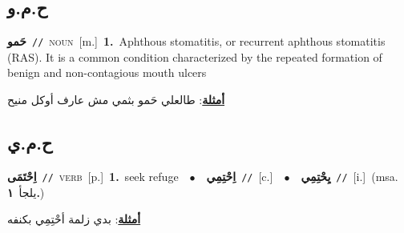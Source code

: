 \documentclass[10pt,a4paper,twoside]{article} %
\begin{document}
\begin{multicols}{2}
\vspace{-3mm}
\subsection*{\color{blue}\foreignlanguage{arabic}{ح.م.و}\color{blue}{}} 

{\setlength\topsep{0pt}\textbf{\foreignlanguage{arabic}{حَمو}}\ {\color{gray}\texttt{//}\color{black}}\ \textsc{noun}\ [m.]\ \textbf{1.}~Aphthous stomatitis, or recurrent aphthous stomatitis (RAS). It is a common condition characterized by the repeated formation of benign and non-contagious mouth ulcers\  \begin{flushright}\color{gray}\foreignlanguage{arabic}{\textbf{\underline{\foreignlanguage{arabic}{أمثلة}}}: طالعلي حَمو بثمي مش عارف أوكل منيح}\end{flushright}\color{black}} \vspace{2mm}

\vspace{-3mm}
\subsection*{\color{blue}\foreignlanguage{arabic}{ح.م.ي}\color{blue}{}} 

{\setlength\topsep{0pt}\textbf{\foreignlanguage{arabic}{اِحْتَمَى}}\ {\color{gray}\texttt{//}\color{black}}\ \textsc{verb}\ [p.]\ \textbf{1.}~seek refuge\ \ $\bullet$\ \ \setlength\topsep{0pt}\textbf{\foreignlanguage{arabic}{اِحْتِمِي}}\ {\color{gray}\texttt{//}\color{black}}\ [c.]\ \ $\bullet$\ \ \setlength\topsep{0pt}\textbf{\foreignlanguage{arabic}{يِحْتِمِي}}\ {\color{gray}\texttt{//}\color{black}}\ [i.]\ \color{gray}(msa. \foreignlanguage{arabic}{يلجأ}~\foreignlanguage{arabic}{\textbf{١.}})\color{black}\  \begin{flushright}\color{gray}\foreignlanguage{arabic}{\textbf{\underline{\foreignlanguage{arabic}{أمثلة}}}: بدي زلمة أحْتِمِي بكنفه}\end{flushright}\color{black}} \vspace{2mm}


\end{multicols}
\end{document}
